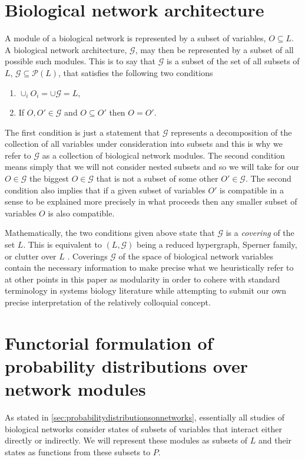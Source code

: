\section{Biological network architecture}\label{sec:covergenotypespace}
A module of a biological network is represented by a subset of variables, $O \subseteq L$. A biological network architecture, $\mathcal{G}$, may then be represented by a subset of all possible such modules. This is to say that $\mathcal{G}$ is a subset of the set of all subsets of $L$, $\mathcal{G} \subseteq \mathcal{P}(L)$, that satisfies the following two conditions
\begin{enumerate}
\item $\cup_i O_i = \cup \mathcal{G} = L$,
\item If $O,O' \in \mathcal{G}$ and $O \subseteq O'$ then $O = O'$.
\end{enumerate}
The first condition is just a statement that $\mathcal{G}$ represents a decomposition of the collection of all variables under consideration into subsets and this is why we refer to $\mathcal{G}$ as a collection of biological network modules. The second condition means simply that we will not consider nested subsets and so we will take for our $O \in \mathcal{G}$ the biggest $O \in \mathcal{G}$ that is not a subset of some other $O' \in \mathcal{G}$. The second condition also implies that if a given subset of variables $O'$ is compatible in a sense to be explained more precisely in what proceeds then any smaller subset of variables $O$ is also compatible.

Mathematically, the two conditions given above state that $\mathcal{G}$ is a \emph{covering} of the set $L$.  This is equivalent to $(L, \mathcal{G})$ being a reduced hypergraph, Sperner family, or clutter over $L$ \cite{Lauritzen1996}.  Coverings $\mathcal{G}$ of the space of biological network variables contain the necessary information to make precise what we heuristically refer to at other points in this paper as modularity in order to cohere with standard terminology in systems biology literature while attempting to submit our own precise interpretation of the relatively colloquial concept.

\section{Functorial formulation of probability distributions over network modules}\label{secsupp:probabilitydistributionsonnetworks}

As stated in \autoref{sec:probabilitydistributionsonnetworks}, essentially all studies of biological networks consider states of subsets of variables that interact either directly or indirectly.  We will represent these modules as subsets of $L$ and their states as functions from these subsets to $P$.

